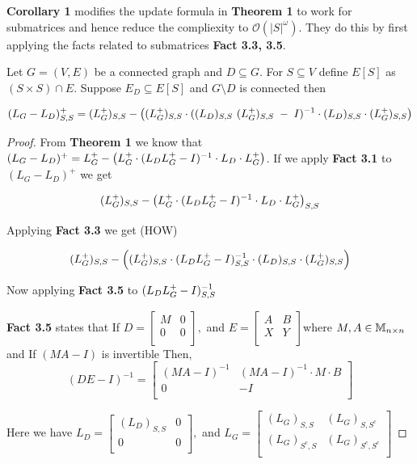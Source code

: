 \textbf{Corollary 1} modifies the update formula in \textbf{Theorem 1} to work for submatrices and hence reduce the compliexity to $\mathcal{O}(|S|^{\omega})$. They do this by first applying the facts related to submatrices \textbf{Fact 3.3, 3.5}. 
\begin{HXc}
  Let $G=(V,E)$ be a connected graph and $D \subseteq G$. For $S \subseteq V$ define $ E[S] $ as $(S \times S) \cap E$. Suppose $E_D \subseteq E[S]$ and  $G \setminus D$ is connected then 
  
  $$ (L_G - L_D)_{S,S}^+ = (L_{G}^{+})_{S,S} - \left( (L_{G}^{+})_{S,S} \cdot ((L_D)_{S,S} \  (L_{G}^{+})_{S,S} \; - \; I)^{-1} \cdot (L_D)_{S,S} \cdot (L_{G}^{+})_{S,S} \right) $$ 
  
\end{HXc}
\begin{proof}
From \textbf{Theorem 1} we know that $(L_G - L_D)^+ = L_{G}^{+} - \left( L_{G}^{+} \cdot (L_DL_{G}^{+}-I)^{-1} \cdot L_D \cdot L_{G}^{+}\right)$. If we apply \textbf{Fact 3.1} to $(L_G - L_D)^+$ we get 

$$ (L_{G}^{+})_{S,S} - \left( L_{G}^{+} \cdot (L_DL_{G}^{+}-I)^{-1} \cdot L_D \cdot L_{G}^{+} \right)_{S,S} $$

Applying \textbf{Fact 3.3} we get (HOW)

$$(L_{G}^{+})_{S,S} - \left( (L_{G}^{+})_{S,S} \cdot (L_DL_{G}^{+}-I)^{-1}_{S,S} \cdot (L_D)_{S,S} \cdot (L_{G}^{+})_{S,S} \right) $$

Now applying \textbf{Fact 3.5} to $(L_DL_{G}^{+}-I)^{-1}_{S,S}$ 

\textbf{Fact 3.5} states that If 
$D = 
\begin{bmatrix}
M & 0 \\
0 & 0 \\
\end{bmatrix},
$ 
and $
E = 
\begin{bmatrix}
A & B \\
X & Y \\
\end{bmatrix}
$where $M, A \in \mathbb{M}_{n \times n}$ and If $(MA - I)$ is invertible Then,
$$ (DE - I)^{-1} = \begin{bmatrix}
(MA - I)^{-1} & (MA - I)^{-1} \cdot M \cdot B \\
0 & -I \\
\end{bmatrix}
$$

Here we have $L_D = 
\begin{bmatrix}
(L_D)_{S,S} & 0 \\
0 & 0 \\
\end{bmatrix},
$ 
and $
L_G = 
\begin{bmatrix}
(L_G)_{S,S} & (L_G)_{S,S^c} \\
(L_G)_{S^c,S} & (L_G)_{S^c,S^c} \\
\end{bmatrix}
$


\end{proof}
